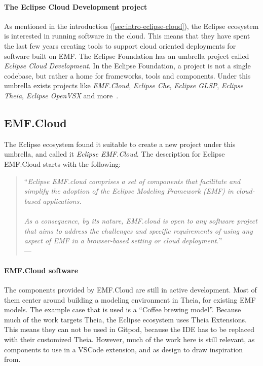 
\paragraph{The Eclipse Cloud Development project}
As mentioned in the introduction (\cref{sec:intro-eclipse-cloud}), the Eclipse ecosystem is interested in running software in the \gls{cloud}.
This means that they have spent the last few years creating tools to support \gls{cloud} oriented deployments for software built on \acrlong{EMF}.
The Eclipse Foundation has an umbrella project called \textit{Eclipse Cloud Development}.
In the Eclipse Foundation, a project is not a single codebase, but rather a home for frameworks, tools and components.
Under this umbrella exists projects like \textit{EMF.Cloud}, \textit{Eclipse Che}, \textit{Eclipse GLSP}, \textit{Eclipse Theia}, \textit{Eclipse OpenVSX} and more~\cite{beatonEclipseCloudDevelopment2014}.

\subsection{EMF.Cloud}
The Eclipse ecosystem found it suitable to create a new project under this umbrella, and called it \textit{Eclipse EMF.Cloud}.
The description for Eclipse EMF.Cloud starts with the following:
\begin{quote}
  ``\textit{Eclipse EMF.cloud comprises a set of components that facilitate and simplify the adoption of the Eclipse Modeling Framework (EMF) in cloud-based applications.\\
  \textelp{}\\
  As a consequence, by its nature, EMF.cloud is open to any software project that aims to address the challenges and specific requirements of using any aspect of EMF in a browser-based setting or cloud deployment.}''\\
  ---~\textcite{smithEclipseEMFCloud2019}
\end{quote}

\paragraph{EMF.Cloud software}
The components provided by EMF.Cloud are still in active development.
Most of them center around building a modeling environment in \gls{Theia}, for existing \acrshort{EMF} models.
The example case that is used is a ``Coffee brewing model''.
Because much of the work targets Theia, the Eclipse ecosystem uses Theia Extensions.
This means they can not be used in \gls{Gitpod}, because the \acrshort{IDE} has to be replaced with their customized Theia.
However, much of the work here is still relevant, as components to use in a \gls{VSCode} extension, and as design to draw inspiration from.\\

